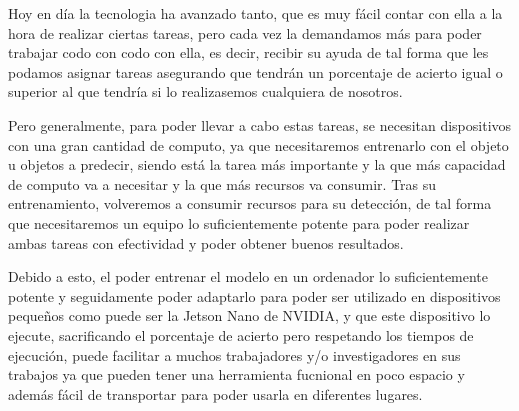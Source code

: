 
Hoy en día la tecnologia ha avanzado tanto, que es muy fácil contar con ella a la hora de realizar ciertas tareas, pero cada vez la demandamos 
más para poder trabajar codo con codo con ella, es decir, recibir su ayuda de tal forma que les podamos asignar tareas asegurando que tendrán un
porcentaje de acierto igual o superior al que tendría si lo realizasemos cualquiera de nosotros.

Pero generalmente, para poder llevar a cabo estas tareas, se necesitan dispositivos con una gran cantidad de computo, ya que necesitaremos entrenarlo 
con el objeto u objetos a predecir, siendo está la tarea más importante y la que más capacidad de computo va a necesitar y la que más recursos va consumir.
Tras su entrenamiento, volveremos a consumir recursos para su detección, de tal forma que necesitaremos un equipo lo suficientemente potente para poder realizar
ambas tareas con efectividad y poder obtener buenos resultados.

Debido a esto, el poder entrenar el modelo en un ordenador lo suficientemente potente y seguidamente poder adaptarlo para poder ser utilizado en dispositivos pequeños
como puede ser la Jetson Nano de NVIDIA, y que este dispositivo lo ejecute, sacrificando el porcentaje de acierto pero respetando los tiempos de ejecución, puede facilitar a
muchos trabajadores y/o investigadores en sus trabajos ya que pueden tener una herramienta fucnional en poco espacio y además fácil de transportar para poder usarla en diferentes
lugares.


